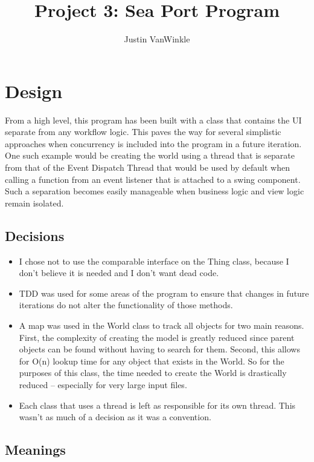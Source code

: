\documentclass[english,floatsintext,man]{apa6}
\title{Project 3: Sea Port Program}
\author{Justin VanWinkle}
\affiliation{
    \vspace{0.5cm}
          \textsuperscript{} 23 April 2017  }
\providecommand{\tightlist}{%
  \setlength{\itemsep}{0pt}\setlength{\parskip}{0pt}}
\begin{document}
\maketitle

\setcounter{secnumdepth}{0}



\section{Design}\label{design}

From a high level, this program has been built with a class that
contains the UI separate from any workflow logic. This paves the way for
several simplistic approaches when concurrency is included into the
program in a future iteration. One such example would be creating the
world using a thread that is separate from that of the Event Dispatch
Thread that would be used by default when calling a function from an
event listener that is attached to a swing component. Such a separation
becomes easily manageable when business logic and view logic remain
isolated.

\subsection{Decisions}\label{decisions}

\begin{itemize}
\tightlist
\item
  I chose not to use the comparable interface on the Thing class,
  because I don't believe it is needed and I don't want dead code.
\item
  TDD was used for some areas of the program to ensure that changes in
  future iterations do not alter the functionality of those methods.
\item
  A map was used in the World class to track all objects for two main
  reasons. First, the complexity of creating the model is greatly
  reduced since parent objects can be found without having to search for
  them. Second, this allows for O(n) lookup time for any object that
  exists in the World. So for the purposes of this class, the time
  needed to create the World is drastically reduced -- especially for
  very large input files.
\item
  Each class that uses a thread is left as responsible for its own
  thread. This wasn't as much of a decision as it was a convention.
\end{itemize}

\subsection{Meanings}\label{meanings}
\end{document}
